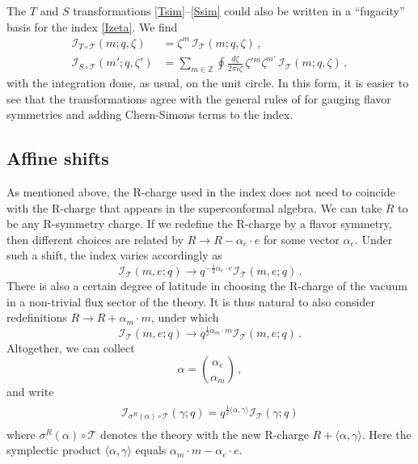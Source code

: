 \documentclass[11pt,letterpaper]{article}
\numberwithin{equation}{section}
\newcommand{\be}{\begin{equation}}
\newcommand{\ee}{\end{equation}}
\newcommand{\Z}{{\mathbb Z}}
\newcommand{\CI}{\mathcal{I}}
\newcommand{\CT}{\mathcal{T}}
\newcommand{\q}{q}
\begin{document}
The $T$ and $S$ transformations \eqref{Tsim}--\eqref{Ssim} could also be written in a ``fugacity'' basis for the index \eqref{Izeta}. We find
%
\begin{align} \CI_{T\circ\CT}(m;q,\zeta) &= \zeta^{m}\,\CI_{\CT}(m;q,\zeta)\,, \\
%
 \CI_{S\circ \CT}(m';q,\zeta') &= \sum_{m\in \Z}\oint \frac{d\zeta}{2\pi i \zeta}\, \zeta'{}^{m}\zeta^{m'}\,\CI_{\CT}(m;q,\zeta)\,,\end{align}
%
with the integration done, as usual, on the unit circle.
In this form, it is easier to see that the transformations agree with the general rules of \cite{KW-index, IY-index} for gauging flavor symmetries and adding Chern-Simons terms to the index.



\subsection{Affine shifts}
\label{sec:aff}



As mentioned above, the R-charge used in the index does not need to coincide with the R-charge that appears in the superconformal algebra. We can take $R$ to be any R-symmetry charge. If we redefine the R-charge by a flavor symmetry, then different choices are related by $R \to R -\alpha_e \cdot e$ for some vector $\alpha_e$. Under such a shift, the index varies accordingly
as
%
\be
\CI_\CT(m,e;\q) \to \q^{-\tfrac{1}{2} \alpha_e \cdot e} \CI_\CT(m,e;\q)\,.
\ee
%
There is also a certain degree of latitude in choosing the R-charge of
the vacuum in a non-trivial flux sector of the theory. It is thus natural to
also consider redefinitions  $R \to R +\alpha_m \cdot m$, under which
%
\be
\CI_\CT(m,e;\q) \to \q^{\tfrac{1}{2}  \alpha_m \cdot m} \CI_\CT(m,e;\q)\,.
\ee
%
Altogether, we can collect
%
\be
\alpha = {\alpha_e \choose \alpha_m}\,,
\ee
%
and write
%
\be
\boxed{\phantom{int}
\CI_{\sigma^R(\alpha) \circ \CT}(\gamma;\q) = \q^{\frac{1}{2} \langle \alpha, \gamma \rangle} \CI_\CT(\gamma;\q) \phantom{\int}}
\ee
%
where $\sigma^R(\alpha) \circ \CT$ denotes the theory with the new R-charge $R+\langle \alpha, \gamma \rangle$.
Here the symplectic product $\langle \alpha, \gamma \rangle$ equals $\alpha_m \cdot m - \alpha_e \cdot e$.
\end{document}
